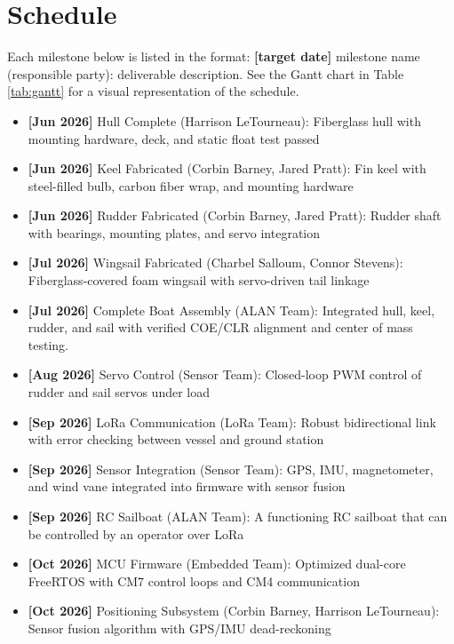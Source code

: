 
\section{Schedule}
\label{sec:schedule}

Each milestone below is listed in the format: \textbf{[target date]} milestone name (responsible party): deliverable description. See the Gantt chart in Table \ref{tab:gantt} for a visual representation of the schedule.

\begin{itemize}
    \item \textbf{[Jun 2026]} Hull Complete (Harrison LeTourneau): Fiberglass hull with mounting hardware, deck, and static float test passed
    \item \textbf{[Jun 2026]} Keel Fabricated (Corbin Barney, Jared Pratt): Fin keel with steel-filled bulb, carbon fiber wrap, and mounting hardware
    \item \textbf{[Jun 2026]} Rudder Fabricated (Corbin Barney, Jared Pratt): Rudder shaft with bearings, mounting plates, and servo integration
    \item \textbf{[Jul 2026]} Wingsail Fabricated (Charbel Salloum, Connor Stevens): Fiberglass-covered foam wingsail with servo-driven tail linkage
    \item \textbf{[Jul 2026]} Complete Boat Assembly (ALAN Team): Integrated hull, keel, rudder, and sail with verified COE/CLR alignment and center of mass testing.
    \item \textbf{[Aug 2026]} Servo Control (Sensor Team): Closed-loop PWM control of rudder and sail servos under load
    \item \textbf{[Sep 2026]} LoRa Communication (LoRa Team): Robust bidirectional link with error checking between vessel and ground station
    \item \textbf{[Sep 2026]} Sensor Integration (Sensor Team): GPS, IMU, magnetometer, and wind vane integrated into firmware with sensor fusion
    \item \textbf{[Sep 2026]} RC Sailboat (ALAN Team): A functioning RC sailboat that can be controlled by an operator over LoRa
    \item \textbf{[Oct 2026]} MCU Firmware (Embedded Team): Optimized dual-core FreeRTOS with CM7 control loops and CM4 communication
    \item \textbf{[Oct 2026]} Positioning Subsystem (Corbin Barney, Harrison LeTourneau): Sensor fusion algorithm with GPS/IMU dead-reckoning

\end{itemize}
